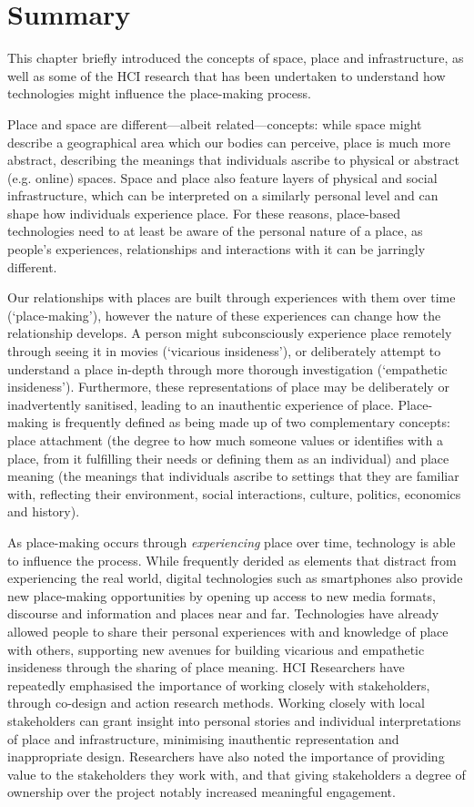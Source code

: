 \section{Summary}

This chapter briefly introduced the concepts of space, place and infrastructure, as well as some of the HCI research that has been undertaken to understand how technologies might influence the place-making process.

Place and space are different---albeit related---concepts: while space might describe a geographical area which our bodies can perceive, place is much more abstract, describing the meanings that individuals ascribe to physical or abstract (e.g. online) spaces. Space and place also feature layers of physical and social infrastructure, which can be interpreted on a similarly personal level and can shape how individuals experience place. For these reasons, place-based technologies need to at least be aware of the personal nature of a place, as people's experiences, relationships and interactions with it can be jarringly different.

Our relationships with places are built through experiences with them over time (`place-making'), however the nature of these experiences can change how the relationship develops. A person might subconsciously experience place remotely through seeing it in movies (`vicarious insideness'), or deliberately attempt to understand a place in-depth through more thorough investigation (`empathetic insideness'). Furthermore, these representations of place may be deliberately or inadvertently sanitised, leading to an inauthentic experience of place. Place-making is frequently defined as being made up of two complementary concepts: place attachment (the degree to how much someone values or identifies with a place, from it fulfilling their needs or defining them as an individual) and place meaning (the meanings that individuals ascribe to settings that they are familiar with, reflecting their environment, social interactions, culture, politics, economics and history). 

As place-making occurs through \textit{experiencing} place over time, technology is able to influence the process. While frequently derided as elements that distract from experiencing the real world, digital technologies such as smartphones also provide new place-making opportunities by opening up access to new media formats, discourse and information and places near and far. Technologies have already allowed people to share their personal experiences with and knowledge of place with others, supporting new avenues for building vicarious and empathetic insideness through the sharing of place meaning. HCI Researchers have repeatedly emphasised the importance of working closely with stakeholders, through co-design and action research methods. Working closely with local stakeholders can grant insight into personal stories and individual interpretations of place and infrastructure, minimising inauthentic representation and inappropriate design. Researchers have also noted the importance of providing value to the stakeholders they work with, and that giving stakeholders a degree of ownership over the project notably increased meaningful engagement.

